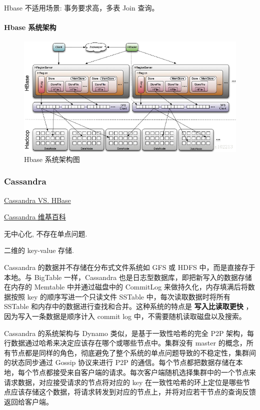\documentclass[hyperref, UTF-8]{ctexart}
\begin{document}
Hbase 不适用场景:  事务要求高，多表 Join 查询。 

\paragraph{Hbase 系统架构}
\label{sec:orgf8710f6}


\begin{figure}[htbp]
\centering
\includegraphics[width=.9\linewidth]{Component/20131226173618000_2017-11-29_19-25-06.png}
\caption{Hbase 系统架构图}
\end{figure}
\subsubsection{Cassandra}
\label{sec:orgb987654}
\href{http://blog.csdn.net/zhangxinrun/article/details/7298601}{Cassandra VS. HBase}   

\href{https://zh.wikipedia.org/zh-hans/Cassandra}{Cassandra 维基百科}    

无中心化, 不存在单点问题.  

二维的 key-value 存储.  

Cassandra 的数据并不存储在分布式文件系统如 GFS 或 HDFS 中，而是直接存于本地。与 BigTable 一样，Cassandra 也是日志型数据库，即把新写入的数据存储在内存的 Memtable 中并通过磁盘中的 CommitLog 来做持久化，内存填满后将数据按照 key 的顺序写进一个只读文件 SSTable 中，每次读取数据时将所有 SSTable 和内存中的数据进行查找和合并。这种系统的特点是 \textbf{写入比读取更快} ，因为写入一条数据是顺序计入 commit log 中，不需要随机读取磁盘以及搜索。 

Cassandra 的系统架构与 Dynamo 类似，是基于一致性哈希的完全 P2P 架构，每行数据通过哈希来决定应该存在哪个或哪些节点中。集群没有 master 的概念，所有节点都是同样的角色，彻底避免了整个系统的单点问题导致的不稳定性，集群间的状态同步通过 Gossip 协议来进行 P2P 的通信。每个节点都把数据存储在本地，每个节点都接受来自客户端的请求。每次客户端随机选择集群中的一个节点来请求数据，对应接受请求的节点将对应的 key 在一致性哈希的环上定位是哪些节点应该存储这个数据，将请求转发到对应的节点上，并将对应若干节点的查询反馈返回给客户端。 
\end{document}
